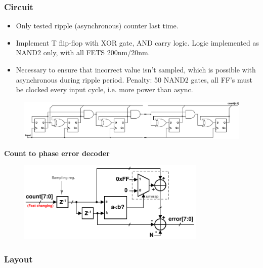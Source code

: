 		\subsubsection{Circuit}
			\begin{itemize}[itemsep=4pt,label=\protect---]
				\item Only tested ripple (asynchronous) counter last time. 
				\item Implement T flip-flop with XOR gate, AND carry logic. Logic implemented as NAND2 only, with all FETS 200nm/20nm. 
				\item Necessary to ensure that incorrect value isn't sampled, which is possible with asynchronous during ripple period. Penalty: 50 NAND2 gates, all FF's must be clocked every input cycle, i.e. more power than async.
			\end{itemize}
			\begin{figure}[htb!]
			        \centering
			        \includegraphics[width=1\textwidth, angle=0]{./figs/sync_counter.pdf}
			\end{figure}


			\textbf{Count to phase error decoder}
			\begin{figure}[htb!]
			        \centering
			        \includegraphics[width=0.8\textwidth, angle=0]{./figs/sc_decoder}
			\end{figure}

		\subsubsection{Layout}


\FloatBarrier

